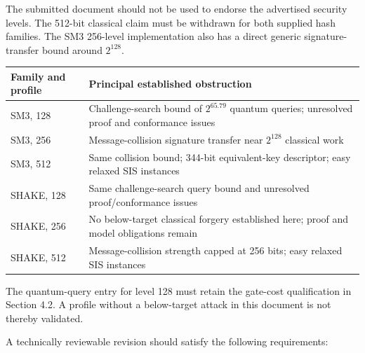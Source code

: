 \documentclass[
  american,
  10pt,
  a4paper,
]{article}
\newcounter{none} %
\begin{document}
The submitted document should not be used to endorse the advertised
security levels. The 512-bit classical claim must be withdrawn for both
supplied hash families. The SM3 256-level implementation also has a
direct generic signature-transfer bound around \(2^{128}\).

{\def\LTcaptype{none} %
\begin{longtable}[]{@{}
  >{\raggedright\arraybackslash}p{}
  >{\raggedright\arraybackslash}p{}@{}}
\toprule\noalign{}
\begin{minipage}[b]{\linewidth}\raggedright
Family and profile
\end{minipage} & \begin{minipage}[b]{\linewidth}\raggedright
Principal established obstruction
\end{minipage} \\
\midrule\noalign{}
\endhead
\bottomrule\noalign{}
\endlastfoot
SM3, 128 & Challenge-search bound of \(2^{65.79}\) quantum queries;
unresolved proof and conformance issues \\
SM3, 256 & Message-collision signature transfer near \(2^{128}\)
classical work \\
SM3, 512 & Same collision bound; 344-bit equivalent-key descriptor; easy
relaxed SIS instances \\
SHAKE, 128 & Same challenge-search query bound and unresolved
proof/conformance issues \\
SHAKE, 256 & No below-target classical forgery established here; proof
and model obligations remain \\
SHAKE, 512 & Message-collision strength capped at 256 bits; easy relaxed
SIS instances \\
\end{longtable}
}

The quantum-query entry for level 128 must retain the gate-cost
qualification in Section 4.2. A profile without a below-target attack in
this document is not thereby validated.

A technically reviewable revision should satisfy the following
requirements:
\end{document}
